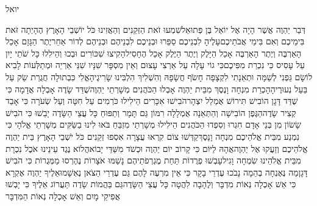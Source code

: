 \documentclass[../main/main.tex]{subfiles}
\begin{document}
\Incipit{}יואל\par
\vspace{\afterchapskip}
\RTLmulticolcolumns
\begin{multicols}{\ncols}
דְּבַר יַהְוֶה אֲשֶׁר הָיָה אֶל יוֹאֵל בֶּן פְּתוּאֵל\PreVerseSpace{}שִׁמְעוּ זֹאת הַזְּקֵנִים וְהַאֲזִינוּ כֹּל יוֹשְׁבֵי הָאָרֶץ הֶהָיְתָה זֹּאת בִּימֵיכֶם וְאִם בִּימֵי אֲבֹתֵיכֶם\PreVerseSpace{}עָלֶיהָ לִבְנֵיכֶם סַפֵּרוּ וּבְנֵיכֶם לִבְנֵיהֶם וּבְנֵיהֶם לְדוֹר אַחֵר\PreVerseSpace{}יֶתֶר הַגָּזָם אָכַל הָאַרְבֶּה וְיֶתֶר הָאַרְבֶּה אָכַל הַיָּלֶק וְיֶתֶר הַיֶּלֶק אָכַל הֶחָסִיל\PreVerseSpace{}הָקִיצוּ שִׁכּוֹרִים וּבְכוּ וְהֵילִלוּ כָּל שֹׁתֵי יָיִן עַל עָסִיס כִּי נִכְרַת מִפִּיכֶם\PreVerseSpace{}כִּי גוֹי עָלָה עַל אַרְצִי עָצוּם וְאֵין מִסְפָּר שִׁנָּיו שִׁנֵּי אַרְיֵה וּמְתַלְּעוֹת לָבִיא לוֹ\PreVerseSpace{}שָׂם גַּפְנִי לְשַׁמָּה וּתְאֵנָתִי לִקְצָפָה חָשֹׂף חֲשָׂפָהּ וְהִשְׁלִיךְ הִלְבִּינוּ שָׂרִיגֶיהָ\PreVerseSpace{}אֱלִי כִּבְתוּלָה חֲגֻרַת שַׂק עַל בַּעַל נְעוּרֶיהָ\PreVerseSpace{}הָכְרַת מִנְחָה וָנֶסֶךְ מִבֵּית יַהְוֶה אָבְלוּ הַכֹּהֲנִים מְשָׁרְתֵי יַהְוֶה\PreVerseSpace{}שֻׁדַּד שָׂדֶה אָבְלָה אֲדָמָה כִּי שֻׁדַּד דָּגָן הוֹבִישׁ תִּירוֹשׁ אֻמְלַל יִצְהָר\PreVerseSpace{}הֹבִישׁוּ אִכָּרִים הֵילִילוּ כֹּרְמִים עַל חִטָּה וְעַל שְׂעֹרָה כִּי אָבַד קְצִיר שָׂדֶה\PreVerseSpace{}הַגֶּפֶן הוֹבִישָׁה וְהַתְּאֵנָה אֻמְלָלָה רִמּוֹן גַּם תָּמָר וְתַפּוּחַ כָּל עֲצֵי הַשָּׂדֶה יָבֵשׁוּ כִּי הֹבִישׁ שָׂשׂוֹן מִן בְּנֵי אָדָם \ClosedSection{}חִגְרוּ וְסִפְדוּ הַכֹּהֲנִים הֵילִילוּ מְשָׁרְתֵי מִזְבֵּחַ בֹּאוּ לִינוּ בַשַּׂקִּים מְשָׁרְתֵי אֱלֹהָי כִּי נִמְנַע מִבֵּית אֱלֹהֵיכֶם מִנְחָה וָנָסֶךְ\PreVerseSpace{}קַדְּשׁוּ צוֹם קִרְאוּ עֲצָרָה אִסְפוּ זְקֵנִים כֹּל יֹשְׁבֵי הָאָרֶץ בֵּית יַהְוֶה אֱלֹהֵיכֶם וְזַעֲקוּ אֶל יַהְוֶה\PreVerseSpace{}אֲהָהּ לַיּוֹם כִּי קָרוֹב יוֹם יַהְוֶה וּכְשֹׁד מִשַּׁדַּי יָבוֹא\PreVerseSpace{}הֲלוֹא נֶגֶד עֵינֵינוּ אֹכֶל נִכְרָת מִבֵּית אֱלֹהֵינוּ שִׂמְחָה וָגִיל\PreVerseSpace{}עָבְשׁוּ פְרֻדוֹת תַּחַת מֶגְרְפֹתֵיהֶם נָשַׁמּוּ אֹצָרוֹת נֶהֶרְסוּ מַמְּגֻרוֹת כִּי הֹבִישׁ דָּגָן\PreVerseSpace{}מַה נֶּאֶנְחָה בְהֵמָה נָבֹכוּ עֶדְרֵי בָקָר כִּי אֵין מִרְעֶה לָהֶם גַּם עֶדְרֵי הַצֹּאן נֶאְשָׁמוּ\PreVerseSpace{}אֵלֶיךָ יַהְוֶה אֶקְרָא כִּי אֵשׁ אָכְלָה נְאוֹת מִדְבָּר וְלֶהָבָה לִהֲטָה כָּל עֲצֵי הַשָּׂדֶה\PreVerseSpace{}גַּם בַּהֲמוֹת שָׂדֶה תַּעֲרוֹג אֵלֶיךָ כִּי יָבְשׁוּ אֲפִיקֵי מָיִם וְאֵשׁ אָכְלָה נְאוֹת הַמִּדְבָּר\OpenSection{}\par

\end{multicols}
\end{document}
